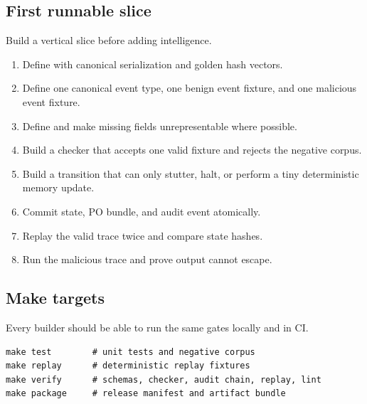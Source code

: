 \documentclass[11pt,oneside]{article}
\newcommand{\code}[1]{\texttt{\detokenize{#1}}}
\begin{document}
\subsection{First runnable slice}
Build a vertical slice before adding intelligence.

\begin{enumerate}
\item Define \code{SCCState} with canonical serialization and golden hash vectors.
\item Define one canonical event type, one benign event fixture, and one malicious event fixture.
\item Define \code{POBundle} and make missing fields unrepresentable where possible.
\item Build a checker that accepts one valid fixture and rejects the negative corpus.
\item Build a transition that can only stutter, halt, or perform a tiny deterministic memory update.
\item Commit state, PO bundle, and audit event atomically.
\item Replay the valid trace twice and compare state hashes.
\item Run the malicious trace and prove output cannot escape.
\end{enumerate}

\subsection{Make targets}
Every builder should be able to run the same gates locally and in CI.

\begin{lstlisting}[caption={Minimum make targets.}]
make test        # unit tests and negative corpus
make replay      # deterministic replay fixtures
make verify      # schemas, checker, audit chain, replay, lint
make package     # release manifest and artifact bundle
\end{lstlisting}
\end{document}
